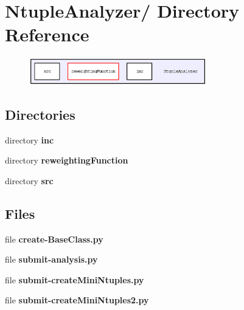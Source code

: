 \section{Ntuple\-Analyzer/ Directory Reference}
\label{dir_8fbd3c57e408b7f922dd5f00b0fb52c2}


\begin{figure}[H]
\begin{center}
\leavevmode
\includegraphics[width=218pt]{dir_8fbd3c57e408b7f922dd5f00b0fb52c2_dep}
\end{center}
\end{figure}
\subsection*{Directories}
\begin{CompactItemize}
\item 
directory \bf{inc}
\item 
directory \bf{reweighting\-Function}
\item 
directory \bf{src}
\end{CompactItemize}
\subsection*{Files}
\begin{CompactItemize}
\item 
file \textbf{create-Base\-Class.py}
\item 
file \textbf{submit-analysis.py}
\item 
file \textbf{submit-create\-Mini\-Ntuples.py}
\item 
file \textbf{submit-create\-Mini\-Ntuples2.py}
\end{CompactItemize}
